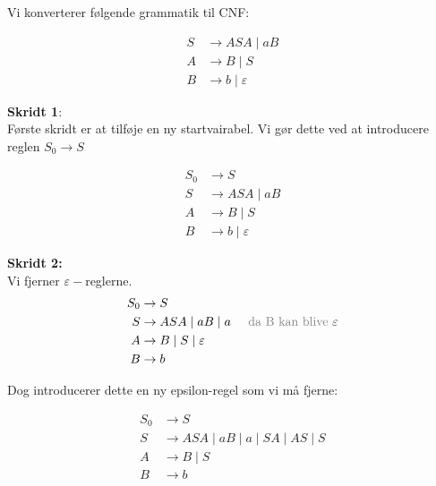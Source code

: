 \begin{example}
  Vi konverterer følgende grammatik til CNF:

\begin{equation*}
\begin{split}
  S &\rightarrow ASA\;|\;aB \\
  A &\rightarrow B\;|\;S \\
B &\rightarrow b\;|\; \varepsilon
\end{split}
\end{equation*}

\noindent
\textbf{\large Skridt 1}:\\
\noindent
Første skridt er at tilføje en ny startvairabel. Vi gør dette ved at introducere reglen $S_{0} \rightarrow S$

\begin{equation*}
\begin{split}
  S_{0} &\rightarrow S\\
  S &\rightarrow ASA \;|\; aB\\
  A &\rightarrow B \;|\; S\\
  B &\rightarrow b \;|\; \varepsilon
\end{split}
\end{equation*}

\noindent
\textbf{\large Skridt 2:}\\
\noindent
Vi fjerner $\varepsilon-$reglerne.
\begin{equation*}
\begin{split}
  S_{0} &\rightarrow S\\
  S &\rightarrow ASA \;|\; aB \;|\; a\;\;\;\;\; \text{\color{gray}da B kan blive }\varepsilon\\
  A &\rightarrow B \;|\; S \; | \; \varepsilon\\
  B &\rightarrow b
\end{split}
\end{equation*}

\noindent
Dog introducerer dette en ny epsilon-regel som vi må fjerne:


\begin{equation*}
\begin{split}
  S_{0} &\rightarrow S\\
  S &\rightarrow ASA \;|\; aB \;|\; a \;| \;SA \;| \;AS \;| \;S\\
  A &\rightarrow B \;|\; S \\
  B &\rightarrow b
\end{split}
\end{equation*}


\end{example}
